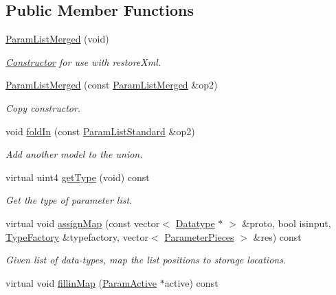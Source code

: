 \subsection*{Public Member Functions}
\begin{DoxyCompactItemize}
\item 
\mbox{\hyperlink{class_param_list_merged_a5b9e6c47a1d11673ab94fedd7bce15ba}{Param\+List\+Merged}} (void)
\begin{DoxyCompactList}\small\item\em \mbox{\hyperlink{class_constructor}{Constructor}} for use with restore\+Xml. \end{DoxyCompactList}\item 
\mbox{\hyperlink{class_param_list_merged_aeaa59d5b53fdbcf3b3f669aef70de20f}{Param\+List\+Merged}} (const \mbox{\hyperlink{class_param_list_merged}{Param\+List\+Merged}} \&op2)
\begin{DoxyCompactList}\small\item\em Copy constructor. \end{DoxyCompactList}\item 
void \mbox{\hyperlink{class_param_list_merged_a2e1b347dc631d5efdc049ec29d73b30f}{fold\+In}} (const \mbox{\hyperlink{class_param_list_standard}{Param\+List\+Standard}} \&op2)
\begin{DoxyCompactList}\small\item\em Add another model to the union. \end{DoxyCompactList}\item 
virtual uint4 \mbox{\hyperlink{class_param_list_merged_a39f0621f7d34c4aa4d591fd51b2ab5fe}{get\+Type}} (void) const
\begin{DoxyCompactList}\small\item\em Get the type of parameter list. \end{DoxyCompactList}\item 
virtual void \mbox{\hyperlink{class_param_list_merged_a54e5b3089383a5d80efbd23791992e4b}{assign\+Map}} (const vector$<$ \mbox{\hyperlink{class_datatype}{Datatype}} $\ast$ $>$ \&proto, bool isinput, \mbox{\hyperlink{class_type_factory}{Type\+Factory}} \&typefactory, vector$<$ \mbox{\hyperlink{struct_parameter_pieces}{Parameter\+Pieces}} $>$ \&res) const
\begin{DoxyCompactList}\small\item\em Given list of data-\/types, map the list positions to storage locations. \end{DoxyCompactList}\item 
virtual void \mbox{\hyperlink{class_param_list_merged_aa4252b6768505e059edfe83ebdbf2065}{fillin\+Map}} (\mbox{\hyperlink{class_param_active}{Param\+Active}} $\ast$active) const

\end{DoxyCompactItemize}
